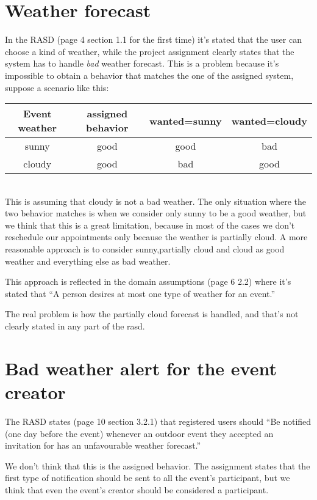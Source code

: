 \documentclass[10pt,a4paper,titlepage]{article}
\begin{document}
\section{Weather forecast}
In the RASD (page 4 section 1.1 for the first time) it's stated that the user can choose a kind of weather, while the project assignment clearly states that the system has to handle \emph{bad} weather forecast. This is a problem because it's impossible to obtain a behavior that matches the one of the assigned system, suppose a scenario like this:\\
\begin{tabular}{|c|c|c|c|}
\hline 
Event weather & assigned behavior & wanted=sunny & wanted=cloudy \\ 
\hline 
sunny & good & good & bad \\ 
\hline 
cloudy & good & bad & good \\ 
\hline 
\end{tabular}\\
This is assuming that cloudy is not a bad weather. The only situation where the two behavior matches is when we consider only sunny to be a good weather, but we think that this is a great limitation, because in most of the cases we don't reschedule our appointments only because the weather is partially cloud. A more reasonable approach is to consider sunny,partially cloud and cloud as good weather and everything else as bad weather. 

This approach is reflected in the domain assumptions (page 6 2.2) where it's stated that ``A person desires at most one type of weather for an event.''

The real problem is how the partially cloud forecast is handled, and that's not clearly stated in any part of the rasd.

\section{Bad weather alert for the event creator}
The RASD states (page 10 section 3.2.1) that registered users should ``Be notified (one day before the event) whenever an outdoor event they accepted an invitation for has an unfavourable weather forecast.''

We don't think that this is the assigned behavior. The assignment states that the first type of notification should be sent to all the event's participant, but we think that even the event's creator should be considered a participant.

\pagebreak
\end{document}
